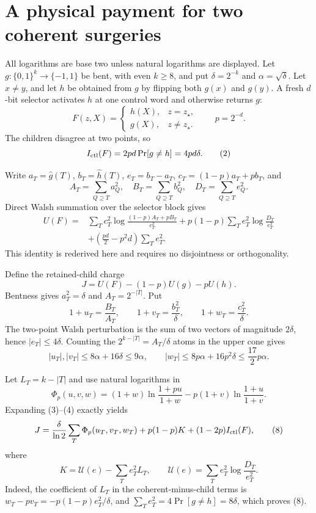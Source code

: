 \section*{A physical payment for two coherent surgeries}

All logarithms are base two unless natural logarithms are displayed.  Let
$g:\{0,1\}^k\to\{-1,1\}$ be bent, with even $k\ge8$, and put
$\delta=2^{-k}$ and $\alpha=\sqrt\delta$.  Let $x\ne y$, and let $h$ be
obtained from $g$ by flipping both $g(x)$ and $g(y)$.  A fresh $d$-bit
selector activates $h$ at one control word and otherwise returns $g$:
\[
 F(z,X)=\begin{cases}h(X),&z=z_\star,\\g(X),&z\ne z_\star.\end{cases}
 \qquad p=2^{-d}.
\tag{1}
\]
The children disagree at two points, so
\[
 I_{\rm ctl}(F)=2pd\Pr[g\ne h]=4pd\delta.                 \tag{2}
\]

Write $a_T=\widehat g(T)$, $b_T=\widehat h(T)$,
$e_T=b_T-a_T$, $c_T=(1-p)a_T+pb_T$, and
\[
 A_T=\sum_{Q\supseteq T}a_Q^2,\quad
 B_T=\sum_{Q\supseteq T}b_Q^2,\quad
 D_T=\sum_{Q\supseteq T}e_Q^2.
\]
Direct Walsh summation over the selector block gives
\begin{align}
 U(F)={}&\sum_Tc_T^2\log\frac{(1-p)A_T+pB_T}{c_T^2}
 +p(1-p)\sum_Te_T^2\log\frac{D_T}{e_T^2}\\
 &+\left(\frac{pd}{2}-p^2d\right)\sum_Te_T^2.             \tag{3}
\end{align}
This identity is rederived here and requires no disjointness or
orthogonality.

Define the retained-child charge
\[
 J=U(F)-(1-p)U(g)-pU(h).                                  \tag{4}
\]
Bentness gives $a_T^2=\delta$ and $A_T=2^{-|T|}$.  Put
\[
 1+u_T=\frac{B_T}{A_T},\qquad
 1+v_T=\frac{b_T^2}{\delta},\qquad
 1+w_T=\frac{c_T^2}{\delta}.                              \tag{5}
\]
The two-point Walsh perturbation is the sum of two vectors of magnitude
$2\delta$, hence $|e_T|\le4\delta$.  Counting the
$2^{k-|T|}=A_T/\delta$ atoms in the upper cone gives
\[
 |u_T|,|v_T|\le8\alpha+16\delta\le9\alpha,
 \qquad |w_T|\le8p\alpha+16p^2\delta\le\frac{17}{2}p\alpha.
\tag{6}
\]

Let $L_T=k-|T|$ and use natural logarithms in
\[
 \Phi_p(u,v,w)
 =(1+w)\ln\frac{1+pu}{1+w}
 -p(1+v)\ln\frac{1+u}{1+v}.                              \tag{7}
\]
Expanding (3)--(4) exactly yields
\[
 J=\frac{\delta}{\ln2}\sum_T\Phi_p(u_T,v_T,w_T)
 +p(1-p)K +(1-2p)I_{\rm ctl}(F),                          \tag{8}
\]
where
\[
 K=\mathcal U(e)-\sum_Te_T^2L_T,
 \qquad \mathcal U(e)=\sum_Te_T^2\log\frac{D_T}{e_T^2}. \tag{9}
\]
Indeed, the coefficient of $L_T$ in the coherent-minus-child terms is
$w_T-pv_T=-p(1-p)e_T^2/\delta$, and
$\sum_Te_T^2=4\Pr[g\ne h]=8\delta$, which proves (8).

